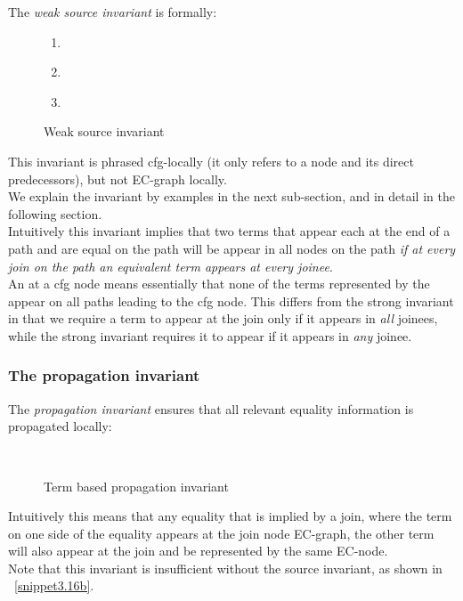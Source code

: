 The \emph{weak source invariant} is formally:
\begin{figure}[H]
\begin{enumerate}
	\item {}\\
	\item {}\\
	\item {}\\
\end{enumerate}
\caption{Weak source invariant}
\label{weak_source_invariant}
\end{figure}
This invariant is phrased cfg-locally (it only refers to a node and its direct predecessors), but not EC-graph locally.\\
We explain the invariant by examples in the next sub-section, and in detail in the following section.\\
Intuitively this invariant implies that two terms that appear each at the end of a path and are equal on the path will be appear in all nodes on the path \emph{if at every join on the path an equivalent term appears at every joinee}.\\
An \rgfa at a cfg node means essentially that none of the terms represented by the \rgfa appear on all paths leading to the cfg node.
This differs from the strong invariant in that we require a term to appear at the join only if it appears in \emph{all} joinees,
while the strong invariant requires it to appear if it appears in \emph{any} joinee.

\subsubsection{The propagation invariant}
The \emph{propagation invariant}  ensures that all relevant equality information is propagated locally:
\begin{figure}[H]
 \\
\caption{Term based propagation invariant}
\label{propagation_invariant_terms}
\end{figure}
Intuitively this means that any equality that is implied by a join, where the term on one side of the equality appears at the join node EC-graph, the other term will also appear at the join and be represented by the same EC-node.\\
Note that this invariant is insufficient without the source invariant, as shown in ~\ref{snippet3.16b}.


